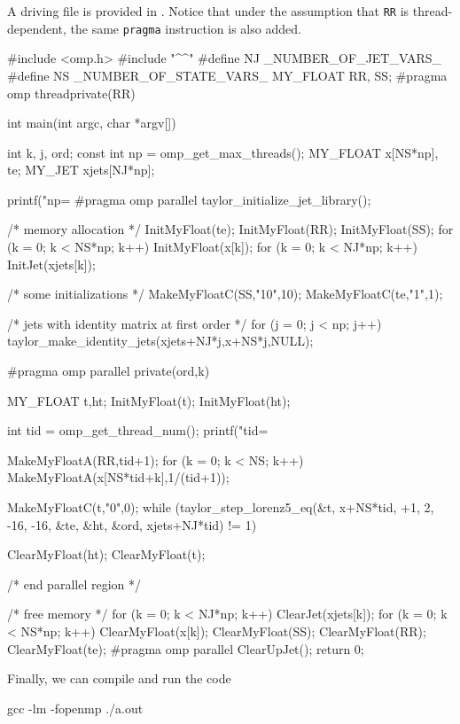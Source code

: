 \documentclass[10pt]{article}
\theoremstyle{remark}
\newcommand{\mainfile}{}
\newcommand{\odecfile}{}
\newcommand{\odehfile}{}
\begin{document}
\medskip
A driving file is provided in \mainfile{}. Notice that under the
assumption that \verb+RR+ is thread-dependent, the same \verb+pragma+
instruction is also added.

\begin{code}[title={File: \mainfile{}}]
    #include <omp.h>
    #include "^\odehfile{}^"
    #define NJ _NUMBER_OF_JET_VARS_
    #define NS _NUMBER_OF_STATE_VARS_
    MY_FLOAT RR, SS;
    #pragma omp threadprivate(RR)
    
    int main(int argc, char *argv[])
    {
      int k, j, ord;
      const int np = omp_get_max_threads();
      MY_FLOAT x[NS*np], te;
      MY_JET xjets[NJ*np];
    
      printf("np=%
    #pragma omp parallel
      taylor_initialize_jet_library();
      
      /* memory allocation */
      InitMyFloat(te); InitMyFloat(RR); InitMyFloat(SS);
      for (k = 0; k < NS*np; k++) {InitMyFloat(x[k]);}
      for (k = 0; k < NJ*np; k++) {InitJet(xjets[k]);}
      
      /* some initializations */
      MakeMyFloatC(SS,"10",10);
      MakeMyFloatC(te,"1",1);
      
      /* jets with identity matrix at first order */
      for (j = 0; j < np; j++) {taylor_make_identity_jets(xjets+NJ*j,x+NS*j,NULL);}
    
    #pragma omp parallel private(ord,k)
      {
        MY_FLOAT t,ht;
        InitMyFloat(t); InitMyFloat(ht);
    
        int tid = omp_get_thread_num();
        printf("tid=%
        
        MakeMyFloatA(RR,tid+1);
        for (k = 0; k < NS; k++) {MakeMyFloatA(x[NS*tid+k],1/(tid+1));}
    
        MakeMyFloatC(t,"0",0);
        while (taylor_step_lorenz5_eq(&t, x+NS*tid, +1, 2, -16, -16,
                                      &te, &ht, &ord, xjets+NJ*tid) != 1) {}
    
        ClearMyFloat(ht); ClearMyFloat(t);
      } /* end parallel region */
      
      /* free memory */
      for (k = 0; k < NJ*np; k++) {ClearJet(xjets[k]);}
      for (k = 0; k < NS*np; k++) {ClearMyFloat(x[k]);}
      ClearMyFloat(SS); ClearMyFloat(RR); ClearMyFloat(te);
    #pragma omp parallel
      ClearUpJet();
      return 0;
    }
\end{code}
Finally, we can compile  and run the code
\begin{command}
    gcc \mainfile{} \odecfile{} -lm -fopenmp
    ./a.out
\end{command}
\end{document}
